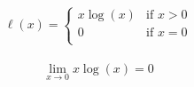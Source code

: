 \documentclass{article}
\begin{document}
\begin{align*}
    \label{simple_equation}
    \ell(x) =
    \left\{\begin{array}{lr}
        x \log (x) & \text{if } x > 0\\
        0 & \text{if } x = 0\\
      \end{array} \right.
\end{align*}





\begin{align*}
  \lim_{x \to 0} x \log(x) = 0
  \end{align*}
\end{document}
